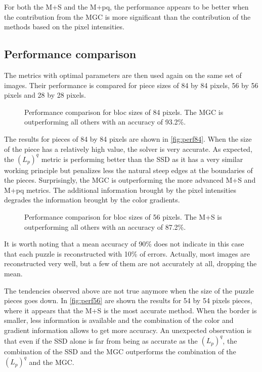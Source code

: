 For both the M+S and the M+pq, the performance appears to be better when the contribution from the MGC is more significant than the contribution of the methods based on the pixel intensities.

\subsection{Performance comparison}

The metrics with optimal parameters are then used again on the same set of images. Their performance is compared for piece sizes of 84 by 84 pixels, 56 by 56 pixels and 28 by 28 pixels.

\begin{figure}[H]
    \centering
    
    \caption{Performance comparison for bloc sizes of 84 pixels. The MGC is outperforming all others with an accuracy of 93.2\%.}
    \label{fig:perf84}
\end{figure}

The results for pieces of 84 by 84 pixels are shown in \autoref{fig:perf84}. When the size of the piece has a relatively high value, the solver is very accurate. As expected, the $(L_p)^q$ metric is performing better than the SSD as it has a very similar working principle but penalizes less the natural steep edges at the boundaries of the pieces. Surprisingly, the MGC is outperforming the more advanced M+S and M+pq metrics. The additional information brought by the pixel intensities degrades the information brought by the color gradients.

\begin{figure}[H]
    \centering
    
    \caption{Performance comparison for bloc sizes of 56 pixels. The M+S is outperforming all others with an accuracy of 87.2\%.}
    \label{fig:perf56}
\end{figure}


It is worth noting that a mean accuracy of 90\% does not indicate in this case that each puzzle is reconstructed with 10\% of errors. Actually, most images are reconstructed very well, but a few of them are not accurately at all, dropping the mean.

The tendencies observed above are not true anymore when the size of the puzzle pieces goes down. In \autoref{fig:perf56} are shown the results for 54 by 54 pixels pieces, where it appears that the M+S is the most accurate method. When the border is smaller, less information is available and the combination of the color and gradient information allows to get more accuracy. An unexpected observation is that even if the SSD alone is far from being as accurate as the $(L_p)^q$, the combination of the SSD and the MGC outperforms the combination of the $(L_p)^q$ and the MGC.

